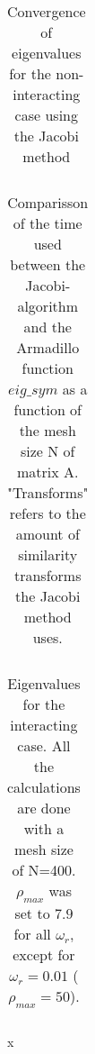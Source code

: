 
\begin{table}[H]\caption{Convergence of eigenvalues for the non-interacting case using the Jacobi method}
	\label{tab:eigval}
	\begin{tabular}{cccc}
		
	\end{tabular}
\end{table}


\begin{table}[H]\caption{Comparisson of the time used between the Jacobi-algorithm and the Armadillo function  $eig\_sym$ as a function of the mesh size N of matrix A. "Transforms" refers to the amount of similarity transforms the Jacobi method uses.}
	\label{tab:time}
	\begin{tabular}{cccccc}
		
	\end{tabular}
\end{table}




\begin{table}[H]\caption{Eigenvalues for the interacting case. All the calculations are done with a mesh size of N=400. $ \rho_{max} $ was set to $ 7.9 $ for all $ \omega_r $, except for $ \omega_r  = 0.01$ ( $ \rho_{max} =50$). }
	\label{tab:omega}
	\begin{tabular}{cccc}
		
	\end{tabular}
\end{table}x